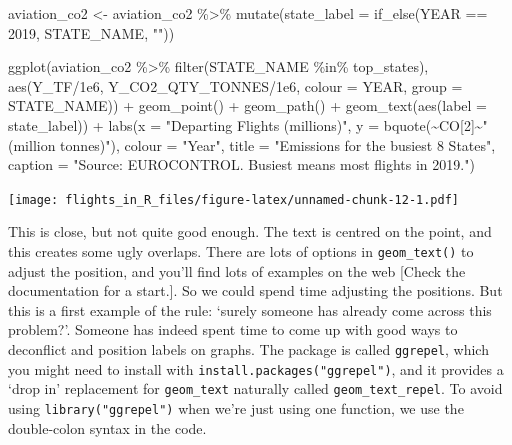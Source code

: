 \documentclass[
]{book}
\newenvironment{Shaded}{\begin{snugshade}}{\end{snugshade}}
\newcommand{\AttributeTok}[1]{\textcolor[rgb]{0.77,0.63,0.00}{#1}}
\newcommand{\DecValTok}[1]{\textcolor[rgb]{0.00,0.00,0.81}{#1}}
\newcommand{\FloatTok}[1]{\textcolor[rgb]{0.00,0.00,0.81}{#1}}
\newcommand{\FunctionTok}[1]{\textcolor[rgb]{0.00,0.00,0.00}{#1}}
\newcommand{\NormalTok}[1]{#1}
\newcommand{\OtherTok}[1]{\textcolor[rgb]{0.56,0.35,0.01}{#1}}
\newcommand{\SpecialCharTok}[1]{\textcolor[rgb]{0.00,0.00,0.00}{#1}}
\newcommand{\StringTok}[1]{\textcolor[rgb]{0.31,0.60,0.02}{#1}}
\begin{document}
\begin{Shaded}
\begin{Highlighting}[]
\NormalTok{aviation\_co2 }\OtherTok{\textless{}{-}}\NormalTok{ aviation\_co2 }\SpecialCharTok{\%\textgreater{}\%} 
  \FunctionTok{mutate}\NormalTok{(}\AttributeTok{state\_label =} \FunctionTok{if\_else}\NormalTok{(YEAR }\SpecialCharTok{==} \DecValTok{2019}\NormalTok{, STATE\_NAME, }\StringTok{""}\NormalTok{))}

\FunctionTok{ggplot}\NormalTok{(aviation\_co2 }\SpecialCharTok{\%\textgreater{}\%} 
         \FunctionTok{filter}\NormalTok{(STATE\_NAME }\SpecialCharTok{\%in\%}\NormalTok{ top\_states), }
       \FunctionTok{aes}\NormalTok{(Y\_TF}\SpecialCharTok{/}\FloatTok{1e6}\NormalTok{, Y\_CO2\_QTY\_TONNES}\SpecialCharTok{/}\FloatTok{1e6}\NormalTok{, }
           \AttributeTok{colour =}\NormalTok{ YEAR, }\AttributeTok{group =}\NormalTok{ STATE\_NAME)) }\SpecialCharTok{+}
  \FunctionTok{geom\_point}\NormalTok{() }\SpecialCharTok{+} 
  \FunctionTok{geom\_path}\NormalTok{() }\SpecialCharTok{+}
  \FunctionTok{geom\_text}\NormalTok{(}\FunctionTok{aes}\NormalTok{(}\AttributeTok{label =}\NormalTok{ state\_label)) }\SpecialCharTok{+}
  \FunctionTok{labs}\NormalTok{(}\AttributeTok{x =} \StringTok{"Departing Flights (millions)"}\NormalTok{, }
       \AttributeTok{y =} \FunctionTok{bquote}\NormalTok{(}\SpecialCharTok{\textasciitilde{}}\NormalTok{CO[}\DecValTok{2}\NormalTok{]}\SpecialCharTok{\textasciitilde{}}\StringTok{" (million tonnes)"}\NormalTok{),}
       \AttributeTok{colour =} \StringTok{"Year"}\NormalTok{,}
       \AttributeTok{title =} \StringTok{"Emissions for the busiest 8 States"}\NormalTok{,}
       \AttributeTok{caption =} \StringTok{"Source: EUROCONTROL. \textquotesingle{}Busiest\textquotesingle{} means most flights in 2019."}\NormalTok{)}
\end{Highlighting}
\end{Shaded}

\texttt{[image: flights\_in\_R\_files/figure-latex/unnamed-chunk-12-1.pdf]}

This is close, but not quite good enough. The text is centred on the point, and this creates some ugly overlaps. There are lots of options in \texttt{geom\_text()} to adjust the position, and you'll find lots of examples on the web {[}Check the documentation for a start.{]}. So we could spend time adjusting the positions. But this is a first example of the rule: `surely someone has already come across this problem?'. Someone has indeed spent time to come up with good ways to deconflict and position labels on graphs. The package is called \texttt{ggrepel}, which you might need to install with \texttt{install.packages("ggrepel")}, and it provides a `drop in' replacement for \texttt{geom\_text} naturally called \texttt{geom\_text\_repel}. To avoid using \texttt{library("ggrepel")} when we're just using one function, we use the double-colon syntax in the code.
\end{document}

